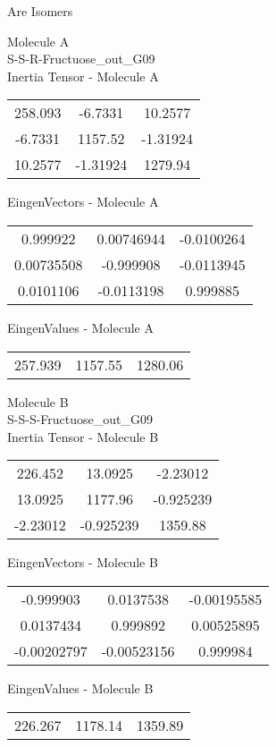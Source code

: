\begin{center}
\vtab
\vtab
\textcolor{NavyBlue}{\Large Are Isomers}
\end{center}
\newpage
\begin{multicols}{2}
\begin{center}
Molecule A \\ 
S-S-R-Fructuose\_out\_G09
\\
Inertia Tensor - Molecule A \\
\vtab
\begin{tabular}{|c c c|}
258.093	 & 	-6.7331	 & 	10.2577	 \\
-6.7331	 & 	1157.52	 & 	-1.31924	 \\
10.2577	 & 	-1.31924	 & 	1279.94
\end{tabular}

\vtab
 EingenVectors - Molecule A     \\
\vtab
\begin{tabular}{|c c c|}
0.999922	 & 	0.00746944	 & 	-0.0100264	 \\
0.00735508	 & 	-0.999908	 & 	-0.0113945	 \\
0.0101106	 & 	-0.0113198	 & 	0.999885
\end{tabular}

\vtab
 EingenValues - Molecule A     \\
\vtab
\begin{tabular}{|c c c|}
257.939	 & 	1157.55	 & 	1280.06
\end{tabular}
\columnbreak

Molecule B \\ 
S-S-S-Fructuose\_out\_G09
\\
Inertia Tensor - Molecule B \\
\vtab
\begin{tabular}{|c c c|}
226.452	 & 	13.0925	 & 	-2.23012	 \\
13.0925	 & 	1177.96	 & 	-0.925239	 \\
-2.23012	 & 	-0.925239	 & 	1359.88
\end{tabular}

\vtab
 EingenVectors - Molecule B     \\
\vtab
\begin{tabular}{|c c c|}
-0.999903	 & 	0.0137538	 & 	-0.00195585	 \\
0.0137434	 & 	0.999892	 & 	0.00525895	 \\
-0.00202797	 & 	-0.00523156	 & 	0.999984
\end{tabular}

\vtab
 EingenValues - Molecule B     \\
\vtab
\begin{tabular}{|c c c|}
226.267	 & 	1178.14	 & 	1359.89
\end{tabular}

\end{center}
\end{multicols}
